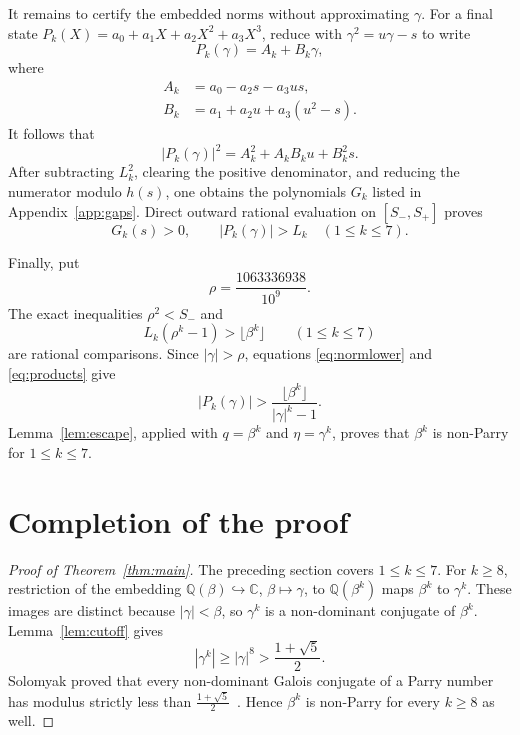 \documentclass[11pt]{amsart}
\theoremstyle{definition}
\newcommand{\Q}{\mathbb{Q}}
\newcommand{\phig}{\frac{1+\sqrt5}{2}}
\begin{document}
It remains to certify the embedded norms without approximating $\gamma$.
For a final state $P_k(X)=a_0+a_1X+a_2X^2+a_3X^3$, reduce with
$\gamma^2=u\gamma-s$ to write
\[
P_k(\gamma)=A_k+B_k\gamma,
\]
where
\begin{align*}
A_k&=a_0-a_2s-a_3us,\\
B_k&=a_1+a_2u+a_3(u^2-s).
\end{align*}
It follows that
\begin{equation}\label{eq:norm}
|P_k(\gamma)|^2=A_k^2+A_kB_ku+B_k^2s.
\end{equation}
After subtracting $L_k^2$, clearing the positive denominator, and reducing
the numerator modulo $h(s)$, one obtains the polynomials $G_k$ listed in
Appendix~\ref{app:gaps}.  Direct outward rational evaluation on
$[S_-,S_+]$ proves
\begin{equation}\label{eq:normlower}
G_k(s)>0,\qquad |P_k(\gamma)|>L_k
\quad (1\leq k\leq7).
\end{equation}

Finally, put
\[
\rho=\frac{1063336938}{10^9}.
\]
The exact inequalities $\rho^2<S_-$ and
\begin{equation}\label{eq:products}
L_k(\rho^k-1)>\lfloor\beta^k\rfloor
\qquad(1\leq k\leq7)
\end{equation}
are rational comparisons.  Since $|\gamma|>\rho$, equations
\eqref{eq:normlower} and \eqref{eq:products} give
\[
|P_k(\gamma)|>
\frac{\lfloor\beta^k\rfloor}{|\gamma|^k-1}.
\]
Lemma~\ref{lem:escape}, applied with $q=\beta^k$ and $\eta=\gamma^k$,
proves that $\beta^k$ is non-Parry for $1\leq k\leq7$.

\section{Completion of the proof}

\begin{proof}[Proof of Theorem~\ref{thm:main}]
The preceding section covers $1\leq k\leq7$.  For $k\geq8$, restriction of
the embedding $\Q(\beta)\hookrightarrow\mathbb C$, $\beta\mapsto\gamma$, to
$\Q(\beta^k)$ maps $\beta^k$ to $\gamma^k$.  These images are distinct because
$|\gamma|<\beta$, so $\gamma^k$ is a non-dominant conjugate of $\beta^k$.
Lemma~\ref{lem:cutoff} gives
\[
|\gamma^k|\geq|\gamma|^8>\phig.
\]
Solomyak proved that every non-dominant Galois conjugate of a Parry number has
modulus strictly less than $\phig$~\cite{Solomyak1994}.  Hence $\beta^k$ is
non-Parry for every $k\geq8$ as well.
\end{proof}
\end{document}
